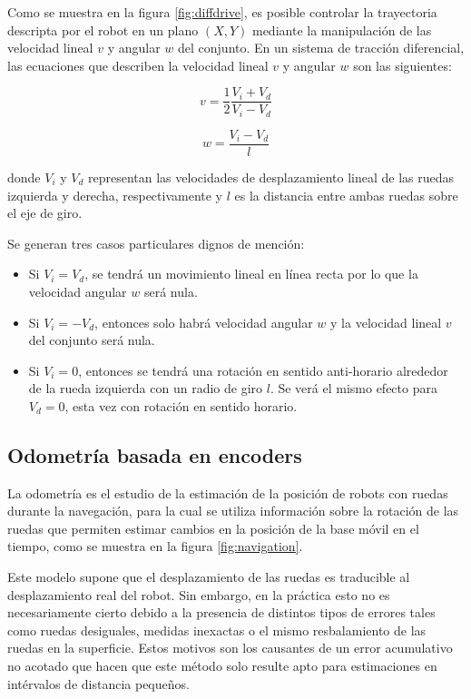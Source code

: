Como se muestra en la figura \ref{fig:diffdrive}, es posible controlar la trayectoria descripta por el robot en un plano $(X,Y)$ mediante la manipulación de las velocidad lineal $v$ y angular $w$ del conjunto\citep{BOOK:3}. En un sistema de tracción diferencial, las ecuaciones que describen la velocidad lineal $v$ y angular $w$ son las siguientes:

\begin{equation}
    \label{eq:diffDriveLinear}
    v = \frac{1}{2} \frac{V_i + V_d}{V_i - V_d}
\end{equation}

\begin{equation}
    \label{eq:diffDriveAngular}
    w = \frac{V_i - V_d}{l}
\end{equation}

donde $V_i$ y $V_d$ representan las velocidades de desplazamiento lineal de las ruedas izquierda y derecha, respectivamente y $l$ es la distancia entre ambas ruedas sobre el eje de giro.

Se generan tres casos particulares dignos de mención:
\begin{itemize}
    \item Si $V_i = V_d$, se tendrá un movimiento lineal en línea recta por lo que la velocidad angular $w$ será nula.
    \item Si $V_i = - V_d$, entonces solo habrá velocidad angular $w$ y la velocidad lineal $v$ del conjunto será nula.
    \item Si $V_i = 0$, entonces se tendrá una rotación en sentido anti-horario alrededor de la rueda izquierda con un radio de giro $l$. Se verá el mismo efecto para $V_d = 0$, esta vez con rotación en sentido horario.
\end{itemize}

\subsection{Odometría basada en encoders}

La odometría es el estudio de la estimación de la posición de robots con ruedas durante la navegación, para la cual se utiliza información sobre la rotación de las ruedas que permiten estimar cambios en la posición de la base móvil en el tiempo, como se muestra en la figura \ref{fig:navigation}.

Este modelo supone que el desplazamiento de las ruedas es traducible al desplazamiento real del robot. Sin embargo, en la práctica esto no es necesariamente cierto debido a la presencia de distintos tipos de errores tales como ruedas desiguales, medidas inexactas o el mismo resbalamiento de las ruedas en la superficie\citep{PAPER:2}. Estos motivos son los causantes de un error acumulativo no acotado que hacen que este método solo resulte apto para estimaciones en intérvalos de distancia pequeños.

